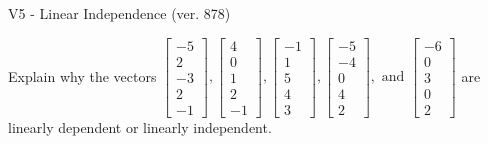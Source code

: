 \begin{exercise}
  \begin{exerciseTitle}V5 - Linear Independence (ver. 878)\end{exerciseTitle}
  \begin{exerciseStatement}
    Explain why the vectors \(\left[\begin{array}{r}
-5 \\
2 \\
-3 \\
2 \\
-1
\end{array}\right] , \left[\begin{array}{r}
4 \\
0 \\
1 \\
2 \\
-1
\end{array}\right] , \left[\begin{array}{r}
-1 \\
1 \\
5 \\
4 \\
3
\end{array}\right] , \left[\begin{array}{r}
-5 \\
-4 \\
0 \\
4 \\
2
\end{array}\right] , \text{ and } \left[\begin{array}{r}
-6 \\
0 \\
3 \\
0 \\
2
\end{array}\right]\) are linearly dependent or linearly independent.	



\end{exerciseStatement}
\end{exercise}
